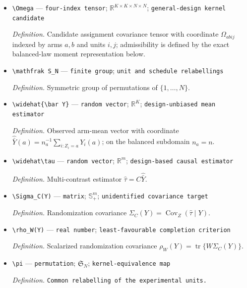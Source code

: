 \documentclass{article}
\begin{document}
\begin{itemize}
  \item \texttt{\textbackslash{}\allowbreak{}Omega} --- \texttt{four-\allowbreak{}index tensor}; \(\mathbb R^{K\times K\times N\times N}\); \texttt{general-\allowbreak{}design kernel candidate}
  \par\smallskip\noindent\emph{Definition.} Candidate assignment covariance tensor with coordinate \(\Omega_{abij}\) indexed by arms \(a,b\) and units \(i,j\); admissibility is defined by the exact balanced-law moment representation below.
  \item \texttt{\textbackslash{}\allowbreak{}mathfrak S\_\allowbreak{}N} --- \texttt{finite group}; \texttt{unit and schedule relabellings}
  \par\smallskip\noindent\emph{Definition.} Symmetric group of permutations of \(\{1,\ldots,N\}\).
  \item \texttt{\textbackslash{}\allowbreak{}widehat\{\textbackslash{}\allowbreak{}bar Y\}\allowbreak{}} --- \texttt{random vector}; \(\mathbb R^K\); \texttt{design-\allowbreak{}unbiased mean estimator}
  \par\smallskip\noindent\emph{Definition.} Observed arm-mean vector with coordinate \(\widehat{\bar Y}(a)=n_a^{-1}\sum_{i:Z_i=a}Y_i(a)\); on the balanced subdomain \(n_a=n\).
  \item \texttt{\textbackslash{}\allowbreak{}widehat\textbackslash{}\allowbreak{}tau} --- \texttt{random vector}; \(\mathbb R^m\); \texttt{design-\allowbreak{}based causal estimator}
  \par\smallskip\noindent\emph{Definition.} Multi-contrast estimator \(\widehat\tau=C\widehat{\bar Y}\).
  \item \texttt{\textbackslash{}\allowbreak{}Sigma\_\allowbreak{}C(Y)} --- \texttt{matrix}; \(\mathbb S_+^m\); \texttt{unidentified covariance target}
  \par\smallskip\noindent\emph{Definition.} Randomization covariance \(\Sigma_C(Y)=\operatorname{Cov}_Z(\widehat\tau\mid Y)\).
  \item \texttt{\textbackslash{}\allowbreak{}rho\_\allowbreak{}W(Y)} --- \texttt{real number}; \texttt{least-\allowbreak{}favourable completion criterion}
  \par\smallskip\noindent\emph{Definition.} Scalarized randomization covariance \(\rho_W(Y)=\operatorname{tr}\{W\Sigma_C(Y)\}\).
  \item \texttt{\textbackslash{}\allowbreak{}pi} --- \texttt{permutation}; \(\mathfrak S_N\); \texttt{kernel-\allowbreak{}equivalence map}
  \par\smallskip\noindent\emph{Definition.} \texttt{Common relabelling of the experimental units.}

\end{itemize}
\end{document}
